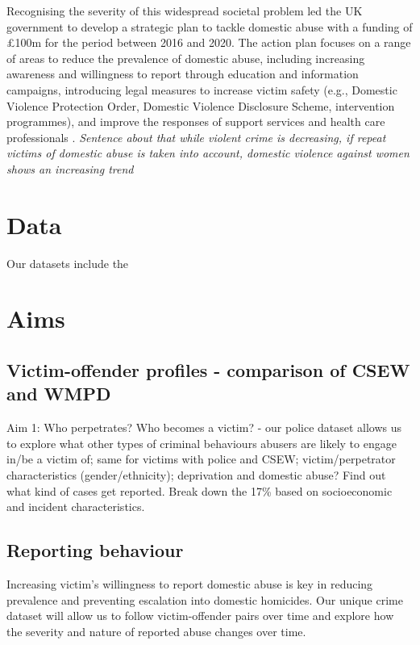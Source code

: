 \documentclass[12pt, letterpaper]{article}
\begin{document}
Recognising the severity of this widespread societal problem led the UK government to develop a strategic plan to tackle domestic abuse with a funding of £100m for the period between 2016 and 2020. The action plan focuses on a range of areas to reduce the prevalence of domestic abuse, including increasing awareness and willingness to report through education and information campaigns, introducing legal measures to increase victim safety (e.g., Domestic Violence Protection Order, Domestic Violence Disclosure Scheme, intervention programmes), and improve the responses of support services and health care professionals \cite{vawag}. \textit{Sentence about that while violent crime is decreasing, if repeat victims of domestic abuse is taken into account, domestic violence against women shows an increasing trend}

\section{Data}

Our datasets include the 




\section{Aims}

\subsection{Victim-offender profiles - comparison of CSEW and WMPD}

Aim 1: Who perpetrates? Who becomes a victim? - our police dataset allows us to explore what other types of criminal behaviours abusers are likely to engage in/be a victim of; same for victims with police and CSEW; victim/perpetrator characteristics (gender/ethnicity); deprivation and domestic abuse? Find out what kind of cases get reported. Break down the 17\% based on socioeconomic and incident characteristics.


\subsection{Reporting behaviour}

Increasing victim's willingness to report domestic abuse is key in reducing prevalence and preventing escalation into domestic homicides. Our unique crime dataset will allow us to follow victim-offender pairs over time and explore how the severity and nature of reported abuse changes over time. 
\end{document}
